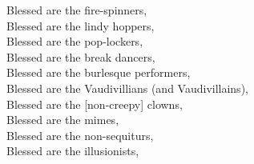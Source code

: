 \bverse Blessed are the fire-spinners, \\

\bverse Blessed are the lindy hoppers, \\

\bverse Blessed are the pop-lockers, \\

\bverse Blessed are the break dancers, \\

\bverse Blessed are the burlesque performers, \\

\bverse Blessed are the Vaudivillians (and Vaudivillains), \\

\bverse Blessed are the [non-creepy] clowns, \\

\bverse Blessed are the mimes, \\

\bverse Blessed are the non-sequiturs, \\

\bverse Blessed are the illusionists, \\

